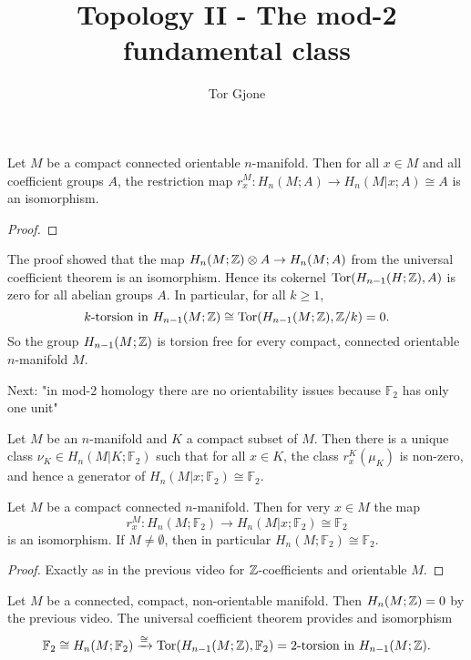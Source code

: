 \documentclass[a4paper,11pt,english]{article}
\title{\textbf{Topology II - The mod-2 fundamental class}}
\author{Tor Gjone}
\def\F{\mathbb{F}}
\begin{document}
\mmaketitle


\begin{thrm}
Let $M$ be a compact connected orientable $n$-manifold. Then for all $x \in M$
and all coefficient groups $A$, the restriction map $r^M_x : H_n(M;A) \to
H_n(M|x;A) \cong A$ is an isomorphism.
\end{thrm}


\begin{proof}

\end{proof}

\begin{note}
The proof showed that the map $H_n(M;\mathbb{Z}) \otimes A \to H_n(M;A)$ from the
universal coefficient theorem is an isomorphism. Hence its cokernel
$\operatorname{Tor}(H_{n-1}(H;\mathbb{Z}), A)$ is zero for all abelian groups $A$. In particular, for
all $k \ge 1$, 
\[  k\text{-torsion in } H_{n-1}(M;\mathbb{Z}) \cong \operatorname{Tor}(H_{n-1}(M;\mathbb{Z}), \mathbb{Z}/k) = 0. \]
So the group $H_{n-1}(M;\mathbb{Z})$ is torsion free for every compact, connected
orientable $n$-manifold $M$.
\end{note}

Next: "in mod-2 homology there are no orientability issues because $\F_2$ has
only one unit"

\begin{thrm}
Let $M$ be an $n$-manifold and $K$ a compact subset of $M$. Then there is a
unique class $\nu_K \in H_n(M|K; \F_2)$ such that for all $x \in K$, the class
$r^K_x(\mu_K)$ is non-zero, and hence a generator of $H_n(M|x;\F_2) \cong \F_2$.
\end{thrm}

\begin{corol}
Let $M$ be a compact connected $n$-manifold. Then for very $x \in M$ the map 
\[ r^M_x : H_n(M;\F_2) \to H_n(M|x;\F_2) \cong \F_2 \]
is an isomorphism. If $M \ne \emptyset$, then in particular $H_n(M;\F_2) \cong
\F_2$.
\end{corol}

\begin{proof}
Exactly as in the previous video for $\mathbb{Z}$-coefficients and orientable $M$.
\end{proof}

\begin{remark}
Let $M$ be a connected, compact, non-orientable manifold. Then $H_n(M;\mathbb{Z}) = 0$
by the previous video. The universal coefficient theorem provides and
isomorphism  
\[ \F_2 \cong H_n(M; \F_2) \congto \Tor(H_{n-1}(M;\Z), \F_2) = 2\text{-torsion
in } H_{n-1} (M;\Z). \]
\end{remark}
\end{document}
